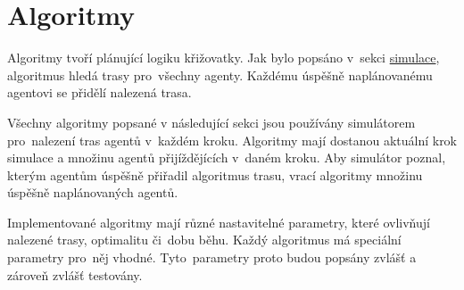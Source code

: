 \chapter{Algoritmy}\label{ch:algoritmy}

%

Algoritmy tvoří plánující logiku křižovatky.
Jak bylo popsáno v~sekci \hyperref[sec:simulace]{simulace}, algoritmus hledá trasy pro~všechny agenty.
Každému úspěšně naplánovanému agentovi se přidělí nalezená trasa.

Všechny algoritmy popsané v následující sekci jsou používány simulátorem pro~nalezení tras agentů v~každém kroku.
Algoritmy mají dostanou aktuální krok simulace a množinu agentů přijíždějících v~daném kroku.
Aby simulátor poznal, kterým agentům úspěšně přiřadil algoritmus trasu,
vrací algoritmy množinu úspěšně naplánovaných agentů.

Implementované algoritmy mají různé nastavitelné parametry, které ovlivňují nalezené trasy, optimalitu či~dobu běhu.
Každý algoritmus má speciální parametry pro~něj vhodné.
Tyto~parametry proto budou popsány zvlášť a zároveň zvlášť testovány.








